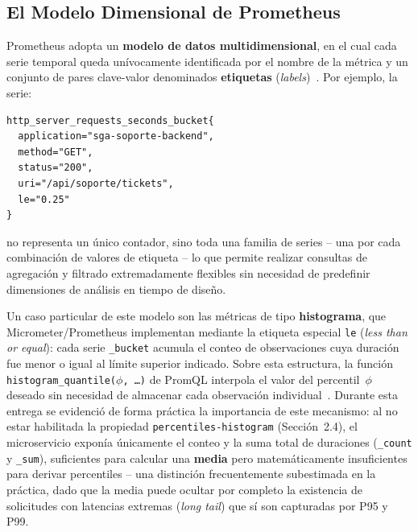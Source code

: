 ﻿\documentclass[11pt,a4paper]{article}
\begin{document}
\subsection{El Modelo Dimensional de Prometheus}
Prometheus adopta un \textbf{modelo de datos multidimensional}, en el cual cada serie temporal queda un\'ivocamente identificada por el nombre de la m\'etrica y un conjunto de pares clave-valor denominados \textbf{etiquetas} (\textit{labels})~\cite{kleppmann2017designing}. Por ejemplo, la serie:

\begin{lstlisting}[basicstyle=\ttfamily\scriptsize]
http_server_requests_seconds_bucket{
  application="sga-soporte-backend",
  method="GET",
  status="200",
  uri="/api/soporte/tickets",
  le="0.25"
}
\end{lstlisting}

\noindent no representa un \'unico contador, sino toda una familia de series -- una por cada combinaci\'on de valores de etiqueta -- lo que permite realizar consultas de agregaci\'on y filtrado extremadamente flexibles sin necesidad de predefinir dimensiones de an\'alisis en tiempo de dise\~no.

Un caso particular de este modelo son las m\'etricas de tipo \textbf{histograma}, que Micrometer/Prometheus implementan mediante la etiqueta especial \texttt{le} (\textit{less than or equal}): cada serie \texttt{\_bucket} acumula el conteo de observaciones cuya duraci\'on fue menor o igual al l\'imite superior indicado. Sobre esta estructura, la funci\'on \texttt{histogram\_quantile(\ensuremath{\phi}, \dots)} de PromQL interpola el valor del percentil~\ensuremath{\phi} deseado sin necesidad de almacenar cada observaci\'on individual~\cite{jain1991art}. Durante esta entrega se evidenci\'o de forma pr\'actica la importancia de este mecanismo: al no estar habilitada la propiedad \texttt{percentiles-histogram} (Secci\'on~2.4), el microservicio expon\'ia \'unicamente el conteo y la suma total de duraciones (\texttt{\_count} y \texttt{\_sum}), suficientes para calcular una \textbf{media} pero matem\'aticamente insuficientes para derivar percentiles -- una distinci\'on frecuentemente subestimada en la pr\'actica, dado que la media puede ocultar por completo la existencia de solicitudes con latencias extremas (\textit{long tail}) que s\'i son capturadas por P95 y P99.

\end{document}
